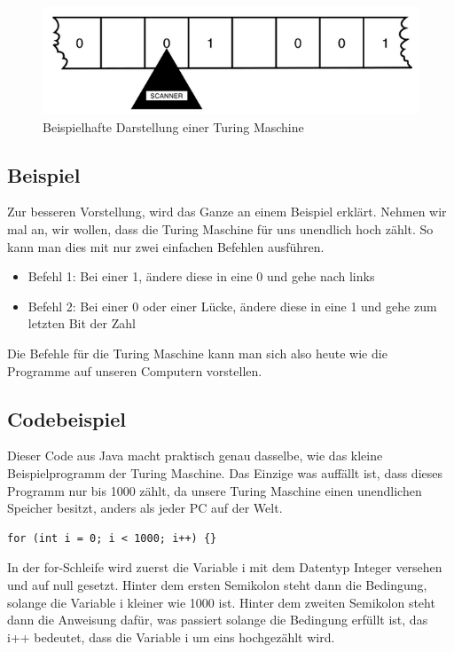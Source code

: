 \begin{figure}[hbtp]
	\centering
	\includegraphics[scale=1]{TuringmashinePicture.png}
	\caption{Beispielhafte Darstellung einer Turing Maschine\cite{theessentialturing}}
\end{figure}

\subsection{Beispiel}
Zur besseren Vorstellung, wird das Ganze an einem Beispiel erklärt. Nehmen wir mal an, wir wollen, dass die Turing Maschine für uns unendlich hoch zählt. So kann man dies mit nur zwei einfachen Befehlen ausführen.

\begin{itemize}
	\item Befehl 1: Bei einer 1, ändere diese in eine 0 und gehe nach links
	\item Befehl 2: Bei einer 0 oder einer Lücke, ändere diese in eine 1 und gehe zum letzten Bit der Zahl
\end{itemize}

Die Befehle für die Turing Maschine kann man sich also heute wie die Programme auf unseren Computern vorstellen.

\subsection{Codebeispiel}
Dieser Code aus Java macht praktisch genau dasselbe, wie das kleine Beispielprogramm der Turing Maschine. Das Einzige was auffällt ist, dass dieses Programm nur bis 1000 zählt, da unsere Turing Maschine einen unendlichen Speicher besitzt, anders als jeder PC auf der Welt.

\begin{verbatim}
for (int i = 0; i < 1000; i++) {}
\end{verbatim}

In der for-Schleife wird zuerst die Variable i mit dem Datentyp Integer versehen und auf null gesetzt. Hinter dem ersten Semikolon steht dann die Bedingung, solange die Variable i kleiner wie 1000 ist. Hinter dem zweiten Semikolon steht dann die Anweisung dafür, was passiert solange die Bedingung erfüllt ist, das i++ bedeutet, dass die Variable i um eins hochgezählt wird. 
